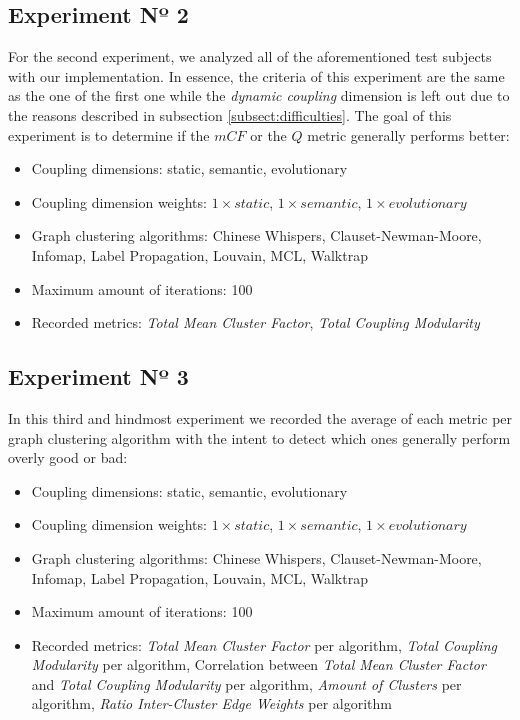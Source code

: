 \documentclass[12pt,a4paper]{report}
\begin{document}
\subsection{Experiment Nº 2}
For the second experiment, we analyzed all of the aforementioned test subjects
with our implementation. In essence, the criteria of this experiment are the
same as the one of the first one while the \textit{dynamic coupling} dimension
is left out due to the reasons described in subsection \ref{subsect:difficulties}.
The goal of this experiment is to determine if the $mCF$ or the $Q$ metric
generally performs better:
\begin{itemize}[noitemsep]
    \item Coupling dimensions: static, semantic, evolutionary
    \item Coupling dimension weights: $1 \times static$, $1 \times semantic$, $1 \times evolutionary$
    \item Graph clustering algorithms: Chinese Whispers, Clauset-Newman-Moore, Infomap, Label Propagation, Louvain, MCL, Walktrap
    \item Maximum amount of iterations: 100
    \item Recorded metrics:
    \textit{Total Mean Cluster Factor},
    \textit{Total Coupling Modularity}
\end{itemize}


\subsection{Experiment Nº 3}
In this third and hindmost experiment we recorded the average of each metric per graph
clustering algorithm with the intent to detect which ones generally perform
overly good or bad:
\begin{itemize}[noitemsep]
    \item Coupling dimensions: static, semantic, evolutionary
    \item Coupling dimension weights: $1 \times static$, $1 \times semantic$, $1 \times evolutionary$
    \item Graph clustering algorithms: Chinese Whispers, Clauset-Newman-Moore, Infomap, Label Propagation, Louvain, MCL, Walktrap
    \item Maximum amount of iterations: 100
    \item Recorded metrics:
    \textit{Total Mean Cluster Factor} per algorithm,
    \textit{Total Coupling Modularity} per algorithm,
    Correlation between \textit{Total Mean Cluster Factor} and \textit{Total Coupling Modularity} per algorithm,
    \textit{Amount of Clusters} per algorithm,
    \textit{Ratio Inter-Cluster Edge Weights} per algorithm
\end{itemize}
\end{document}
